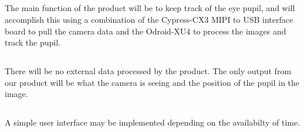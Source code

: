 
\subsection{}
The main function of the product will be to keep track of the eye pupil, and will accomplish this using a combination of the Cypress-CX3 MIPI to USB interface board to pull the camera data and the Odroid-XU4 to process the images and track the pupil. 


\subsection{}
There will be no external data processed by the product.
The only output from our product will be what the camera is seeing and the position of the pupil in the image.

\subsection{}
A simple user interface may be implemented depending on the availabilty of time. 
